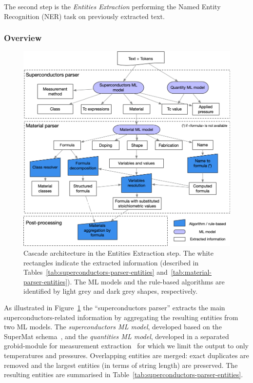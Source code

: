 \documentclass[]{interact}
\theoremstyle{plain}%
\theoremstyle{definition}
\theoremstyle{remark}
\begin{document}
The second step is the \textit{Entities Extraction} performing the Named Entity Recognition (NER) task on previously extracted text. 

\subsubsection*{Overview}

\begin{figure}[ht]
\includegraphics[width=\textwidth]{schema-extraction-colors}
\caption{\label{fig:extraction-ml-models-cascade-architecture} Cascade architecture in the Entities Extraction step. The white rectangles indicate the extracted information (described in Tables~\ref{tab:superconductors-parser-entities} and~\ref{tab:material-parser-entities}). 
The ML models and the rule-based algorithms are identified by light grey and dark grey shapes, respectively.}
\end{figure}

As illustrated in Figure~\ref{fig:extraction-ml-models-cascade-architecture} the ``superconductors parser'' extracts the main superconductors-related information by aggregating the resulting entities from two ML models. 
The \textit{superconductors ML model}, developed based on the SuperMat schema~\cite{foppiano2021supermat}, and the \textit{quantities ML model}, developed in a separated grobid-module for measurement extraction~\cite{foppiano2019quantities} for which we limit the output to only temperatures and pressures.
Overlapping entities are merged: exact duplicates are removed and the largest entities (in terms of string length) are preserved.
The resulting entities are summarised in Table~\ref{tab:superconductors-parser-entities}.
\end{document}
